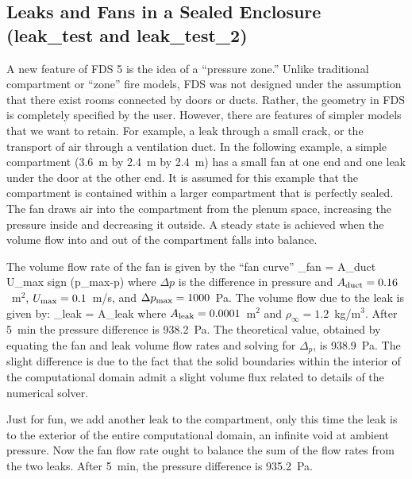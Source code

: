 \documentclass[11pt]{book}
\begin{document}
\clearpage

\subsection{Leaks and Fans in a Sealed Enclosure ({\bf leak\_test} and {\bf leak\_test\_2})  }

A new feature of FDS 5 is the idea of a ``pressure zone.''  Unlike traditional compartment or ``zone'' fire models, FDS was not designed under the assumption that there exist
rooms connected by doors or ducts. Rather, the geometry in FDS is completely specified by the user. However, there are features of simpler models that we want to retain. For example,
a leak through a small crack, or the transport of air through a ventilation duct.  In the following example, a simple compartment (3.6~m by 2.4~m by 2.4~m) has a small fan at one
end and one leak under the door at the other end. It is assumed for this example that the compartment is contained within a larger compartment that is perfectly sealed. The fan draws
air into the compartment from the plenum space, increasing the pressure inside and decreasing it outside.  A steady state is achieved when the volume flow into and out of the compartment
falls into balance.

The volume flow rate of the fan is given by the ``fan curve''
\be {}_{\hbox{\footnotesize fan}} = A_{\hbox{\footnotesize duct}} U_{\hbox{\footnotesize max}} \;
   \hbox{sign} (\Delta p_{\hbox{\footnotesize max}}-\Delta p)
     \ee
where $\Delta p$ is the difference in pressure and $A_{\hbox{\scriptsize duct}}=0.16$~m$^2$, $U_{\hbox{\scriptsize max}}=0.1$~m/s, and $\Delta p_{\hbox{\scriptsize max}}=1000$~Pa.
The volume flow due to the leak is given by:
\be {}_{\hbox{\scriptsize leak}} = A_{\hbox{\scriptsize leak}}  \ee
where $A_{\hbox{\scriptsize leak}}=0.0001$~m$^2$ and $\rho_\infty=1.2$~kg/m$^3$.
After 5~min the pressure difference is 938.2~Pa. The theoretical value, obtained by equating the fan and leak volume flow rates and solving for $\Delta_p$, is 938.9~Pa. The
slight difference is due to the fact that the solid boundaries within the interior of the computational domain admit a slight volume flux related to details of the
numerical solver.

Just for fun, we add another leak to the compartment, only this time the leak is to the exterior of the entire computational domain, an infinite void at ambient pressure.
Now the fan flow rate ought to balance the sum of the flow rates from the two leaks. After 5~min, the pressure difference is 935.2~Pa.
\end{document}
